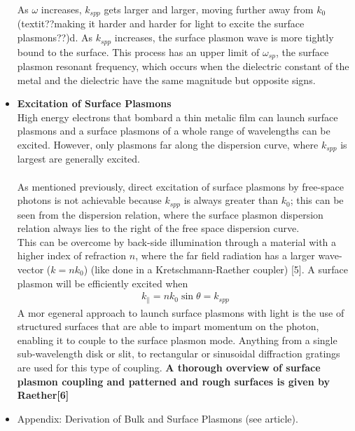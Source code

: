 \begin{itemize}
As $\omega$ increases, $k_{spp}$ gets larger and larger, moving
further  away from $k_0$ (textit{??making it harder and harder 
for light to excite the surface plasmons??})d. As $k_{spp}$ increases,
the surface plasmon wave is more tightly bound to the surface.
This process has an upper limit of $\omega_{sp}$, the surface 
plasmon resonant frequency, which occurs when the dielectric 
constant of the metal and the dielectric have the same 
magnitude but opposite signs.

\item
\textbf{Excitation of Surface Plasmons}\\
High energy electrons that bombard a thin metalic film can
launch surface plasmons and a surface plasmons of a whole range
of wavelengths can be excited. However, only plasmons
far along the dispersion curve, where $k_{spp}$ is largest
are generally excited.
\\
\\
As mentioned previously, direct excitation of surface plasmons by 
free-space photons is not achievable because $k_{spp}$ is 
always greater than $k_0$; this can be seen from the dispersion
relation, where the surface plasmon dispersion relation always
lies to the right of the free space dispersion curve.\\
This can be overcome by back-side illumination through a material
with a higher index of refraction $n$, where the far field radiation
has a larger wave-vector ($k=nk_0$) 
(like done in a Kretschmann-Raether coupler) [5].
A surface plasmon will be efficiently excited when 
\begin{align}
k_{\parallel} = n k_0 \sin \theta = k_{spp}
\end{align}
A mor egeneral approach to launch surface plasmons with light
is the use of structured surfaces that are able to impart momentum
on the photon, enabling it to couple to the surface plasmon mode.
Anything from a single sub-wavelength disk or slit, to rectangular
or sinusoidal diffraction gratings are used for this type of coupling.
\textbf{A thorough overview of surface plasmon coupling 
and patterned and rough surfaces is given by Raether[6]}


\item Appendix: Derivation of Bulk and Surface Plasmons (see article).
\end{itemize}

